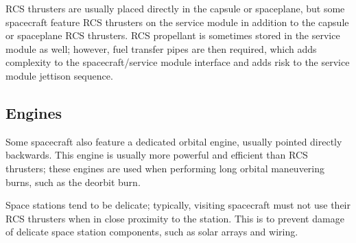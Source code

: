 RCS thrusters are usually placed directly in the capsule or
spaceplane, but some spacecraft feature RCS thrusters on the service
module in addition to the capsule or spaceplane RCS thrusters. RCS
propellant is sometimes stored in the service module as well; however,
fuel transfer pipes are then required, which adds complexity to the
spacecraft/service module interface and adds risk to the service
module jettison sequence.

\subsection{Engines}

Some spacecraft also feature a dedicated orbital engine, usually
pointed directly backwards. This engine is usually more powerful and
efficient than RCS thrusters; these engines are used when performing
long orbital maneuvering burns, such as the deorbit burn.

Space stations tend to be delicate; typically, visiting spacecraft
must not use their RCS thrusters when in close proximity to the
station. This is to prevent damage of delicate space station
components, such as solar arrays and wiring.

